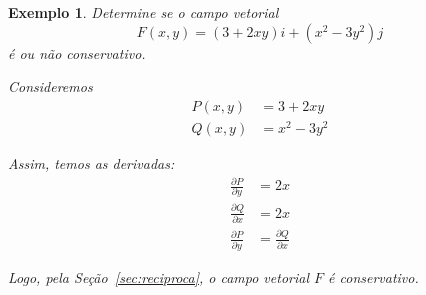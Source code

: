 \documentclass{article}
\newcommand{\PartialDer}[2] {\frac{\partial #1}{\partial #2}}
\newtheorem{example}{Exemplo}[section]
\begin{document}
        \begin{example}
            \label{ex:conservativo}
            Determine se o campo vetorial
            \[
                F(x,y) = (3 + 2xy) i + (x^2 - 3y^2) j
            \]
            é ou não conservativo.

            Consideremos
            \begin{align*}
                P(x,y) &= 3 + 2xy\\
                Q(x,y) &= x^2 - 3y^2
            \end{align*}

            Assim, temos as derivadas:
            \begin{align*}
                \PartialDer{P}{y} &= 2x\\
                \PartialDer{Q}{x} &= 2x\\
                \PartialDer{P}{y} &= \PartialDer{Q}{x}
            \end{align*}

            Logo, pela Seção~\ref{sec:reciproca}, o campo vetorial $F$ é conservativo.
        \end{example}
\end{document}
